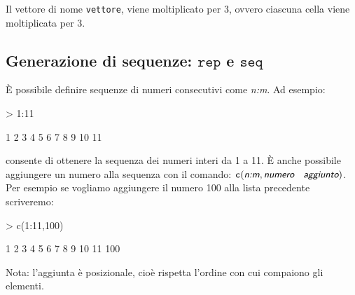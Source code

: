 \documentclass[onecolumn,11pt]{book}
\newcommand{\varia}[1]{\textsl{\textsf{#1}}}
\begin{document}
Il vettore di nome \texttt{vettore}, viene moltiplicato per 3, ovvero ciascuna cella viene moltiplicata per 3.
\subsection{Generazione di sequenze: $\texttt{rep}$ e $\texttt{seq}$} 
\`E possibile definire sequenze di numeri consecutivi come  \varia{n:m}.
Ad esempio:
\begin{Schunk}
\begin{Sinput}
> 1:11 
\end{Sinput}
\begin{Soutput}
 [1]  1  2  3  4  5  6  7  8  9 10 11
\end{Soutput}
\end{Schunk}
consente di ottenere la sequenza dei numeri interi da 1 a 11. \`E anche possibile aggiungere un numero alla sequenza con il comando: 
$\texttt{c}(\varia{n:m},\varia{numero \; aggiunto})$.
Per esempio se vogliamo aggiungere il numero 100 alla lista precedente scriveremo:
\begin{Schunk}
\begin{Sinput}
> c(1:11,100)
\end{Sinput}
\begin{Soutput}
 [1]   1   2   3   4   5   6   7   8   9  10  11 100
\end{Soutput}
\end{Schunk}
Nota: l'aggiunta \`e posizionale, cio\`e rispetta l'ordine con cui compaiono gli elementi. 
\end{document}
